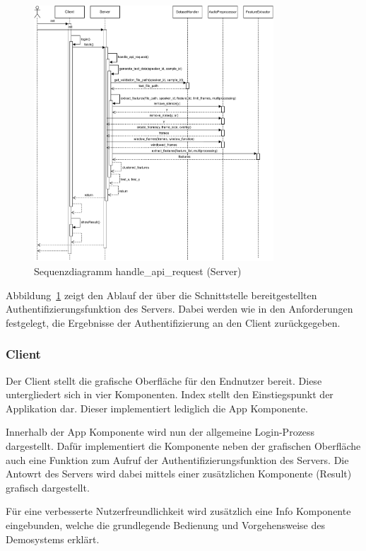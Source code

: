 \begin{figure}
    \centering
    \includegraphics[width=0.8\textwidth, keepaspectratio]{images/SequenzdiagrammClientServer}
    \caption{Sequenzdiagramm handle\_api\_request (Server)}
    \label{fig:SequenceHandleApiRequest}
\end{figure}
Abbildung~\ref{fig:SequenceHandleApiRequest} zeigt den Ablauf der über die Schnittstelle bereitgestellten Authentifizierungsfunktion des Servers.
Dabei werden wie in den Anforderungen festgelegt, die Ergebnisse der Authentifizierung an den Client zurückgegeben.

\subsubsection{Client}
Der Client stellt die grafische Oberfläche für den Endnutzer bereit.
Diese untergliedert sich in vier Komponenten.
Index stellt den Einstiegspunkt der Applikation dar.
Dieser implementiert lediglich die App Komponente.

Innerhalb der App Komponente wird nun der allgemeine Login-Prozess dargestellt.
Dafür implementiert die Komponente neben der grafischen Oberfläche auch eine Funktion zum Aufruf der Authentifizierungsfunktion des Servers.
Die Antowrt des Servers wird dabei mittels einer zusätzlichen Komponente (Result) grafisch dargestellt.

Für eine verbesserte Nutzerfreundlichkeit wird zusätzlich eine Info Komponente eingebunden, welche die grundlegende Bedienung und Vorgehensweise des Demosystems erklärt.

